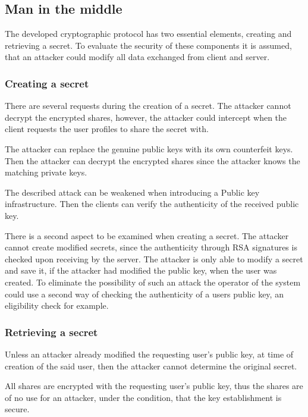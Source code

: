 \subsection{Man in the middle}

The developed cryptographic protocol has two essential elements, creating and
retrieving a secret. To evaluate the security of these components it is
assumed, that an attacker could modify all data exchanged from client and
server.

\subsubsection{Creating a secret}

There are several requests during the creation of a secret. The attacker cannot
decrypt the encrypted shares, however, the attacker could intercept when the
client requests the user profiles to share the secret with.

The attacker can replace the genuine public keys with its own counterfeit keys.
Then the attacker can decrypt the encrypted shares since the attacker knows the
matching private keys.

The described attack can be weakened when introducing a Public key
infrastructure. Then the clients can verify the authenticity of the received
public key.

There is a second aspect to be examined when creating a secret. The attacker
cannot create modified secrets, since the authenticity through RSA signatures
is checked upon receiving by the server. The attacker is only able to modify a
secret and save it, if the attacker had modified the public key, when the user
was created. To eliminate the possibility of such an attack the operator of the
system could use a second way of checking the authenticity of a users public
key, an eligibility check for example.

\subsubsection{Retrieving a secret}

Unless an attacker already modified the requesting user's public key, at time of
creation of the said user, then the attacker cannot determine the original
secret.

All shares are encrypted with the requesting user's public key, thus the shares
are of no use for an attacker, under the condition, that the key establishment
is secure.

